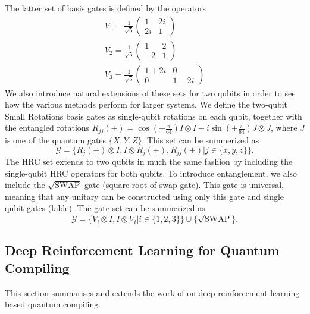 \documentclass[%
 aip,
 floatfix,
 amsmath,amssymb,
 reprint,%
]{revtex4-1}
\begin{document}
The latter set of basis gates is defined by the operators
\begin{align}\label{eq:HRC1}
    V_1 = \frac{1}{\sqrt{5}}
          \begin{pmatrix}
          1 & 2i \\
          2i & 1 
          \end{pmatrix}\\
    V_2 = \frac{1}{\sqrt{5}}
          \begin{pmatrix}
          1 & 2 \\
          -2 & 1 
          \end{pmatrix}\\
    V_3 = \frac{1}{\sqrt{5}}
          \begin{pmatrix}
          1 +2i & 0 \\
          0 & 1 -2i 
          \end{pmatrix}
\end{align}
We also introduce natural extensions of these sets for two qubits in order to see how the various methods perform for larger systems. We define the two-qubit Small Rotations basis gates as single-qubit rotations on each qubit, together with the entangled rotations $R_{jj}(\pm) = \cos{(\pm \frac{\pi}{64})} I \otimes I - i \sin{(\pm \frac{\pi}{64})} J\otimes J$, where $J$ is one of the quantum gates $\{X, Y, Z\}$. This set can be summerized as
\begin{equation}\label{eq:smallrotations2}
    \mathcal{G} = \{R_j(\pm)\otimes I, I\otimes R_j(\pm), R_{jj}(\pm)  |j\in\{x,y,z\}\}.
\end{equation}
The HRC set extends to two qubits in much the same fashion by including the single-qubit HRC operators for both qubits. To introduce entanglement, we also include the $\sqrt{\text{SWAP}}$ gate (square root of swap gate). This gate is universal, meaning that any unitary can be constructed using only this gate and single qubit gates (kilde). The gate set can be summerized as 
\begin{equation}\label{eq:HRC2}
    \mathcal{G} = \{V_i\otimes I, I\otimes V_i    |i\in\{1,2,3\}\} \cup \{\sqrt{\text{SWAP}}\}.
\end{equation}
\subsection{Deep Reinforcement Learning for Quantum Compiling}

This section summarises and extends the work of \citet{QCRL} on deep reinforcement learning based quantum compiling.
\end{document}
